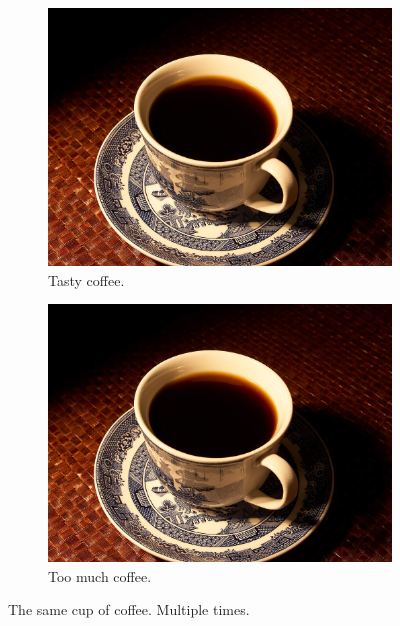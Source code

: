 \documentclass[a4paper,11pt]{article}
\begin{document}
\begin{figure}[h!]
\begin{subfigure}[b]{0.2\linewidth}
		\includegraphics[width=\linewidth]{coffee.jpg}
		\caption{Tasty coffee.}
	\end{subfigure}
	
	\begin{subfigure}[b]{0.5\linewidth}
		\includegraphics[width=\linewidth]{coffee.jpg}
		\caption{Too much coffee.}
	\end{subfigure}
	\caption{The same cup of coffee. Multiple times.}
	\label{fig:coffee3}
\end{figure}

\pagebreak
\end{document}
